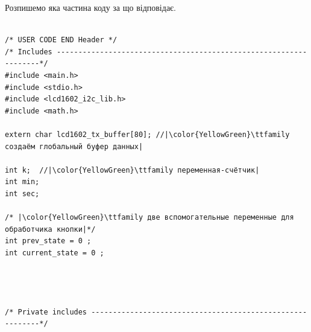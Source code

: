 \documentclass[14pt,a4paper]{scrartcl}
\begin{document}
Розпишемо яка частина коду за що відповідає.




\begin{lstlisting}

/* USER CODE END Header */
/* Includes ------------------------------------------------------------------*/
#include <main.h>
#include <stdio.h>
#include <lcd1602_i2c_lib.h>
#include <math.h>

extern char lcd1602_tx_buffer[80]; //|\color{YellowGreen}\ttfamily создаём глобальный буфер данных|

int k;  //|\color{YellowGreen}\ttfamily переменная-счётчик|
int min;
int sec;

/* |\color{YellowGreen}\ttfamily две вспомогательные переменные для обработчика кнопки|*/
int prev_state = 0 ;
int current_state = 0 ;




/* Private includes ----------------------------------------------------------*/
\end{lstlisting}
\end{document}
